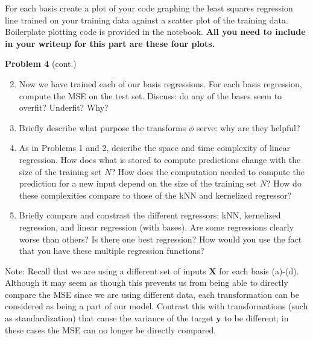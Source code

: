 \documentclass[submit]{harvardml}
\begin{document}
\begin{problem}
\begin{enumerate}
For each basis create a plot of your code graphing the least squares
regression line trained on your training data against a scatter plot
of the training data. Boilerplate plotting code is provided in the
notebook.
\textbf{All you need to include 
in your writeup for this part are these four plots.}
\vspace{1em}
\end{enumerate}
\end{problem}


\newpage
\begin{framed}
\noindent\textbf{Problem 4} (cont.)\\
\begin{enumerate}
\setcounter{enumi}{1}
\item 
Now we have trained each of our basis regressions.  For each basis
regression, compute the MSE on the test set.  Discuss: do any of the
bases seem to overfit?  Underfit?  Why?



\item Briefly describe what purpose the transforms $\phi$ serve: why are they helpful?

\item As in Problems 1 and 2, describe the space and time complexity of linear regression.  How does what is stored to compute predictions change with the size of the training set $N$?  How does the computation needed to compute the prediction for a new input depend on the size of the training set $N$?  How do these complexities compare to those of the kNN and kernelized regressor?

\item Briefly compare and constrast the different regressors: kNN,
  kernelized regression, and linear regression (with bases).  Are some
  regressions clearly worse than others?  Is there one best
  regression?  How would you use the fact that you have these multiple
  regression functions?
  
\end{enumerate}
Note:
Recall that we are using a 
different set of inputs $\mathbf{X}$ for each basis (a)-(d). 
Although it may seem as though this prevents us from being able 
to directly compare the MSE since we are using different data, 
each transformation can be considered as being a part of our model. 
Contrast this with transformations (such as standardization) that cause the variance of the target $\mathbf{y}$ to be different; in these cases the
MSE can no longer be directly compared.

\end{framed}
\end{document}

